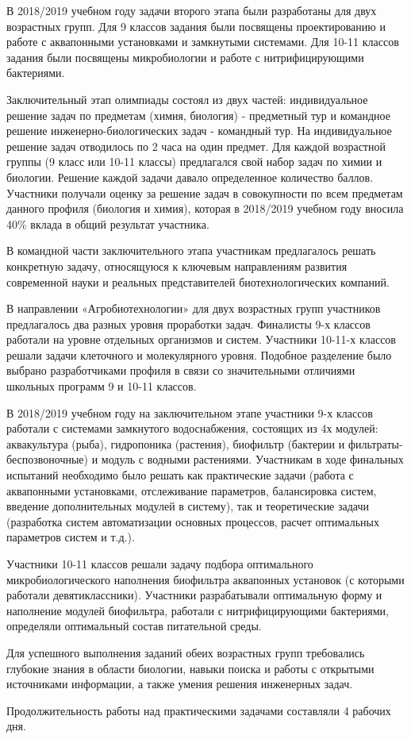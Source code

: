 В 2018/2019 учебном году задачи второго этапа были разработаны для двух возрастных групп. Для 9 классов задания были посвящены проектированию и работе с аквапонными установками и замкнутыми системами. Для 10-11 классов задания были посвящены микробиологии и работе с нитрифицирующими бактериями. 

Заключительный этап олимпиады состоял из двух частей: индивидуальное решение задач по предметам (химия, биология) - предметный тур и командное решение инженерно-биологических задач - командный тур. На индивидуальное решение задач отводилось по 2 часа на один предмет. Для каждой возрастной группы (9 класс или 10-11 классы) предлагался свой набор задач по химии и биологии. Решение каждой задачи давало определенное количество баллов. Участники получали оценку за решение задач в совокупности по всем предметам данного профиля (биология и химия), которая в 2018/2019 учебном году вносила 40\% вклада в общий результат участника.

В командной части заключительного этапа участникам предлагалось  решать конкретную задачу, относящуюся к ключевым направлениям развития современной науки и реальных представителей биотехнологических компаний. 

В направлении «Агробиотехнологии» для двух возрастных групп участников предлагалось два разных уровня проработки задач. Финалисты 9-х классов работали на уровне отдельных организмов и систем. Участники 10-11-х классов решали задачи клеточного и молекулярного уровня. Подобное разделение было выбрано разработчиками профиля в связи со значительными отличиями школьных программ 9 и 10-11 классов. 

В 2018/2019 учебном году на заключительном этапе участники 9-х классов работали с системами замкнутого водоснабжения, состоящих из 4х модулей: аквакультура (рыба), гидропоника (растения), биофильтр (бактерии и фильтраты-беспозвоночные) и модуль с водными растениями. Участникам в ходе финальных испытаний необходимо было решать как практические задачи (работа с аквапонными установками, отслеживание параметров, балансировка систем, введение дополнительных модулей в систему), так и теоретические задачи (разработка систем автоматизации основных процессов, расчет оптимальных параметров систем и т.д.). 

Участники 10-11 классов решали задачу подбора оптимального микробиологического наполнения биофильтра аквапонных установок (с которыми работали девятиклассники). Участники разрабатывали оптимальную форму и наполнение модулей биофильтра, работали с нитрифицирующими бактериями, определяли оптимальный состав питательной среды.

Для успешного выполнения заданий обеих возрастных групп требовались глубокие знания в области биологии, навыки поиска и работы с открытыми источниками информации, а также умения решения инженерных задач.

Продолжительность работы над практическими задачами  составляли 4 рабочих дня. 